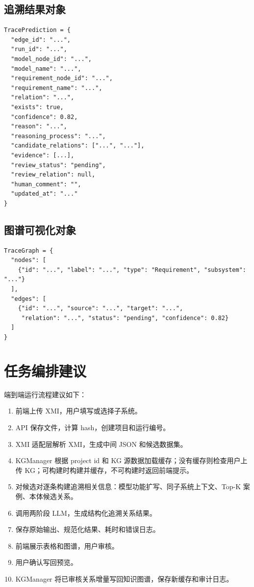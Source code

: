 \documentclass[11pt,a4paper]{article}
\begin{document}
\subsection{追溯结果对象}

\begin{verbatim}
TracePrediction = {
  "edge_id": "...",
  "run_id": "...",
  "model_node_id": "...",
  "model_name": "...",
  "requirement_node_id": "...",
  "requirement_name": "...",
  "relation": "...",
  "exists": true,
  "confidence": 0.82,
  "reason": "...",
  "reasoning_process": "...",
  "candidate_relations": ["...", "..."],
  "evidence": [...],
  "review_status": "pending",
  "review_relation": null,
  "human_comment": "",
  "updated_at": "..."
}
\end{verbatim}

\subsection{图谱可视化对象}

\begin{verbatim}
TraceGraph = {
  "nodes": [
    {"id": "...", "label": "...", "type": "Requirement", "subsystem": "..."}
  ],
  "edges": [
    {"id": "...", "source": "...", "target": "...",
     "relation": "...", "status": "pending", "confidence": 0.82}
  ]
}
\end{verbatim}

\section{任务编排建议}

端到端运行流程建议如下：

\begin{enumerate}
  \item 前端上传 XMI，用户填写或选择子系统。
  \item API 保存文件，计算 hash，创建项目和运行编号。
  \item XMI 适配层解析 XMI，生成中间 JSON 和候选数据集。
  \item KGManager 根据 project id 和 KG 源数据加载缓存；没有缓存则检查用户上传 KG；可构建时构建并缓存，不可构建时返回前端提示。
  \item 对候选对逐条构建追溯相关信息：模型功能扩写、同子系统上下文、Top-K 案例、本体候选关系。
  \item 调用两阶段 LLM，生成结构化追溯关系结果。
  \item 保存原始输出、规范化结果、耗时和错误日志。
  \item 前端展示表格和图谱，用户审核。
  \item 用户确认写回预览。
  \item KGManager 将已审核关系增量写回知识图谱，保存新缓存和审计日志。
\end{enumerate}
\end{document}
